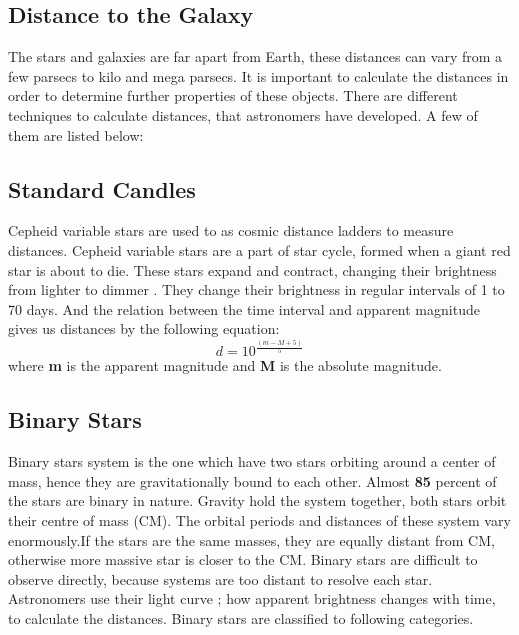 \subsection{Distance to the Galaxy}

The stars and galaxies are far apart from Earth, these distances can vary from a few parsecs to kilo and mega parsecs. It is important to calculate the distances in order to determine further properties of these objects. There are different techniques to calculate distances, that astronomers have developed.
A few of them are listed below:

\subsection{Standard Candles}
 Cepheid variable stars are used to as cosmic distance ladders to measure distances. Cepheid variable stars are a part of star cycle, formed when a giant red star is about to die. These stars expand and contract, changing their brightness from lighter to dimmer \cite{stanc}.  They change their brightness in regular intervals of 1 to 70 days. And the relation between the time interval and apparent magnitude gives us distances by the following equation:
 \begin{equation}
 d= 10^{\frac{(m-M+5)}{5}}
 \end{equation}
where \textbf{m} is the apparent magnitude and \textbf{M} is the absolute magnitude.

\subsection*{Binary Stars }

\cite{bin}Binary stars system is the one which have two stars orbiting around a center of mass, hence they are gravitationally bound to each other. Almost \textbf{85} percent of the stars are binary in nature. Gravity hold the system together, both stars orbit their centre of mass (CM). The orbital periods and distances of these system vary enormously.If the stars are the same masses, they are equally distant from CM, otherwise more massive star is closer to the CM. Binary stars are difficult to observe directly, because systems are too distant to resolve each star.  Astronomers use their light curve ; how apparent brightness changes with time, to calculate the distances. Binary stars are classified to following categories.

